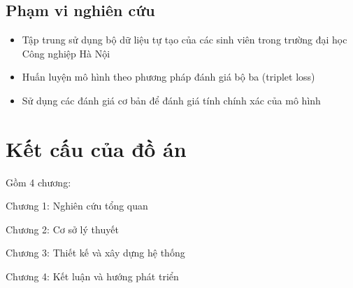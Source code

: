\subsection{Phạm vi nghiên cứu}
\begin{itemize}
      \item Tập trung sử dụng bộ dữ liệu tự tạo của các sinh viên trong trường đại học Công nghiệp Hà Nội
      \item Huấn luyện mô hình theo phương pháp đánh giá bộ ba (triplet loss)
      \item Sử dụng các đánh giá cơ bản để đánh giá tính chính xác của mô hình
\end{itemize}
\section{Kết cấu của đồ án}
Gồm 4 chương:

Chương 1: Nghiên cứu tổng quan

Chương 2: Cơ sở lý thuyết

Chương 3: Thiết kế và xây dựng hệ thống

Chương 4: Kết luận và hướng phát triển





